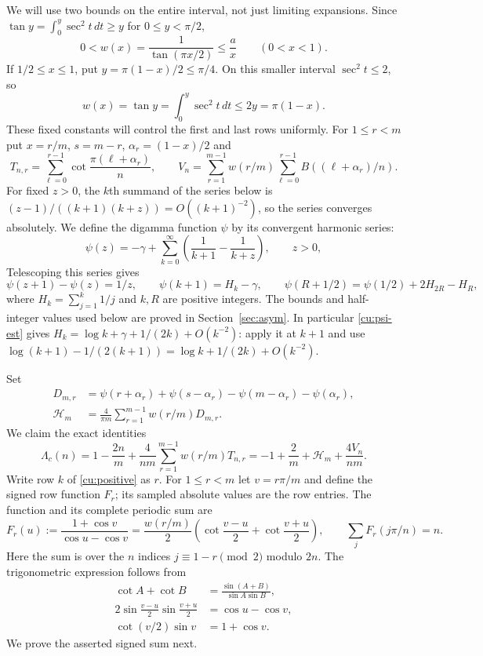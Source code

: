 We will use two bounds on the entire interval, not just limiting
expansions. Since $\tan y=\int_0^y\sec^2t\,dt\geq y$ for
$0\leq y<\pi/2$,
\[
 0<w(x)=\frac1{\tan(\pi x/2)}\leq\frac{a}{x}
                                      \qquad(0<x<1).
\]
If $1/2\leq x\leq1$, put $y=\pi(1-x)/2\leq\pi/4$.
On this smaller interval $\sec^2t\leq2$, so
\[
 w(x)=\tan y=\int_0^y\sec^2t\,dt
                   \leq2y=\pi(1-x).
\]
These fixed constants will control the first and last rows uniformly. For $1\leq r<m$ put
$x=r/m$, $s=m-r$, $\alpha_r=(1-x)/2$ and
\[
 T_{n,r}=\sum_{\ell=0}^{r-1}\cot\frac{\pi(\ell+\alpha_r)}n,
 \qquad V_n=\sum_{r=1}^{m-1}w(r/m)
                    \sum_{\ell=0}^{r-1}B((\ell+\alpha_r)/n).
\]
For fixed $z>0$, the $k$th summand of the series below is
$(z-1)/((k+1)(k+z))=O((k+1)^{-2})$, so the series converges
absolutely. We define the digamma function $\psi$ by its convergent harmonic series:
\begin{equation}\label{cu:psi}
 \psi(z)=-\gamma+\sum_{k=0}^\infty
          \left(\frac1{k+1}-\frac1{k+z}\right),\qquad z>0,
\end{equation}
Telescoping this series gives
\[
 \psi(z+1)-\psi(z)=1/z,\qquad
 \psi(k+1)=H_k-\gamma,\qquad
 \psi(R+1/2)=\psi(1/2)+2H_{2R}-H_R,
\]
where $H_k=\sum_{j=1}^k1/j$ and $k,R$ are positive integers.
The bounds and half-integer values used below are proved in
Section~\ref{sec:asym}. In particular \eqref{cu:psi-est} gives
$H_k=\log k+\gamma+1/(2k)+O(k^{-2})$: apply it at $k+1$ and use
$\log(k+1)-1/(2(k+1))=\log k+1/(2k)+O(k^{-2})$.

Set
\begin{equation}\label{cu:D}
 \begin{aligned}
 D_{m,r}&=\psi(r+\alpha_r)+\psi(s-\alpha_r)
          -\psi(m-\alpha_r)-\psi(\alpha_r),\\
 \mathcal H_m&=\frac4{\pi m}\sum_{r=1}^{m-1}w(r/m)D_{m,r}.
 \end{aligned}
\end{equation}
We claim the exact identities
\begin{equation}\label{cu:exact}
 \Lambda_c(n)=1-\frac{2n}{m}+\frac4{nm}\sum_{r=1}^{m-1}w(r/m)T_{n,r}
       =-1+\frac2m+\mathcal H_m+\frac{4V_n}{nm}.
\end{equation}
Write row $k$ of \eqref{cu:positive} as $r$. For $1\leq r<m$ let
$v=r\pi/m$ and define the signed row function $F_r$; its sampled
absolute values are the row entries. The function and
its complete periodic sum are
\[
 F_r(u):=\frac{1+\cos v}{\cos u-\cos v}
   =\frac{w(r/m)}2\left(\cot\frac{v-u}{2}+\cot\frac{v+u}{2}\right),
 \qquad \sum_jF_r(j\pi/n)=n.
\]
Here the sum is over the $n$ indices $j\equiv1-r\pmod2$
modulo $2n$. The trigonometric expression follows from
\[
 \begin{aligned}
 \cot A+\cot B&=\frac{\sin(A+B)}{\sin A\sin B},\\
 2\sin\frac{v-u}{2}\sin\frac{v+u}{2}&=\cos u-\cos v,\\
 \cot(v/2)\sin v&=1+\cos v.
 \end{aligned}
\] We prove the asserted
signed sum next.

